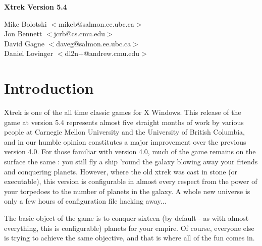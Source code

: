 

\def\tty#1{{\tt #1}}
\def\bold#1{{\bf #1}}

\parindent 0in
\parskip 0.10in 
\textwidth 6.5in
\oddsidemargin 0in
\evensidemargin 0in
\textheight 8.175in
\topmargin -0.25in



\begin{titlepage}
\begin{center}
\vspace*{2in}
\bf
\Huge
Xtrek Version 5.4

\vspace{2in}

\LARGE
Mike Bolotski $<$mikeb@salmon.ee.ubc.ca$>$ \\
Jon Bennett $<$jcrb@cs.cmu.edu$>$ \\
David Gagne $<$daveg@salmon.ee.ubc.ca$>$ \\
Daniel Lovinger $<$dl2n+@andrew.cmu.edu$>$
\end{center}
\end{titlepage}



\tableofcontents \newpage

\section{Introduction}

Xtrek is one of the all time classic games for X Windows. This release
of the game at version 5.4 represents almost five straight months of
work by various people at Carnegie Mellon University and the University
of British Columbia, and in our humble opinion constitutes a major
improvement over the previous version 4.0. For those familiar with
version 4.0, much of the game remains on the surface the same : you
still fly a ship 'round the galaxy blowing away your friends and
conquering planets. However, where the old xtrek was cast in stone (or
executable), this version is configurable in almost every respect from
the power of your torpedoes to the number of planets in the galaxy. A
whole new universe is only a few hours of configuration file hacking
away...

The basic object of the game is to conquer sixteen (by default - as
with almost everything, this is configurable) planets for your empire.
Of course, everyone else is trying to achieve the same objective, and
that is where all of the fun comes in.

